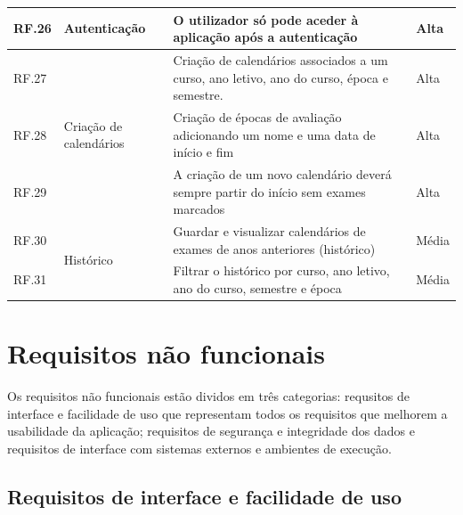 \documentclass[11pt, twoside]{report}
\begin{document}
\begin{center}
\begin{longtable}{|m{1cm}|m{2.2cm}|m{10cm}|m{2cm}|}
			RF.26           & Autenticação                               & O utilizador só pode aceder à aplicação após a autenticação                                                         & Alta                \\
			\hline
			
			RF.27           & \multirow{3}{2cm}{Criação de calendários} & Criação de calendários associados a um curso, ano letivo, ano do curso, época e semestre.                              & Alta                \\
			
			RF.28           &                                              & Criação de épocas de avaliação adicionando um nome e uma data de início e fim                                        & Alta                \\
			
			RF.29           &                                              & A criação de um novo calendário deverá sempre partir do início sem exames marcados                                    & Alta                \\
			\hline
			RF.30           & \multirow{2}{*}{Histórico}                  & Guardar e visualizar calendários de exames de anos anteriores (histórico)                                                & Média              \\
			
			RF.31           &                                              & Filtrar o histórico por curso, ano letivo, ano do curso, semestre e época                                                & Média              \\
			\hline
		\end{longtable}
	\end{center}
	
	
	
	
	\section{Requisitos não funcionais}
	
	Os requisitos não funcionais estão dividos em três categorias: requsitos de interface e facilidade de uso que representam todos os requisitos que melhorem a usabilidade da aplicação; requisitos de segurança e integridade dos dados e requisitos de interface com sistemas externos e ambientes de execução.
	
	\subsection{Requisitos de interface e facilidade de uso}
	
\end{document}
